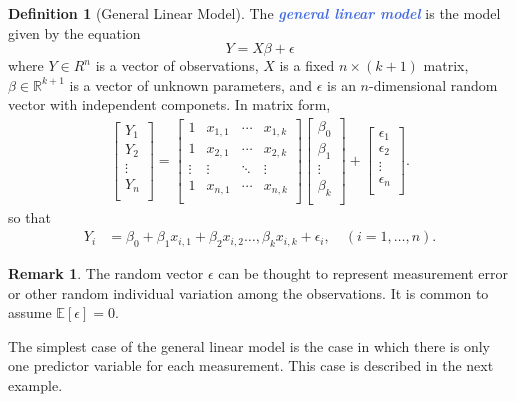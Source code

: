 \documentclass[10pt]{article}
\theoremstyle{definition}
\newtheorem{definition}[theorem]{Definition}
\newtheorem{remark}[theorem]{Remark}
\newcommand{\1}[1]{\textbf{1}_{\left[#1\right]}} %
\def\R{\mathbb{R}} %
\def\E{\mathbb{E}} %
\newcommand{\demph}[1]{\textcolor{RoyalBlue}{\textbf{\slshape #1}}} %
\begin{document}
\begin{definition}[General Linear Model]
  \label{def:general-linear-model}
  The \demph{general linear model} is the model given by the equation
  \begin{equation} \label{eq:general-linear-model-equation}
    Y= X\beta +\epsilon
  \end{equation}
  where $Y\in R^{n}$ is a vector of observations, $X$ is a fixed
  $n\times (k+1)$ matrix, $\beta\in \R^{k+1}$ is a vector of unknown
  parameters, and $\epsilon$ is an $n$-dimensional random vector with
  independent componets. In matrix form,
  \begin{align*}
    \begin{bmatrix}
      Y_{1}\\ Y_{2}\\\vdots \\ Y_{n}\\
    \end{bmatrix}
    =
    \begin{bmatrix}
      1&x_{1,1}&\cdots&x_{1,k}\\
      1&x_{2,1}&\cdots&x_{2,k}\\
      \vdots&\vdots&\ddots&\vdots\\
      1&  x_{n,1}&\cdots&x_{n,k}\\
    \end{bmatrix}
    \begin{bmatrix}
      \beta_{0}\\ \beta_{1}\\ \vdots \\ \beta_{k}\\
    \end{bmatrix}
    +
    \begin{bmatrix}
      \epsilon_{1}\\ \epsilon_{2}\\\vdots \\ \epsilon_{n}\\
    \end{bmatrix}.
  \end{align*}
  so that
  \begin{align*}
    Y_{i}
    &=  \beta_{0}+\beta_{1}x_{i,1}+\beta_{2}x_{i,2}\ldots,\beta_{k}x_{i,k}
      + \epsilon_{i},\quad (i=1,\ldots,n).
  \end{align*}
  \begin{remark}
    The random vector $\epsilon$ can be thought to represent measurement error
    or other random individual variation among the observations. It is common
    to assume $\E\left[\epsilon \right]=0$.
  \end{remark}
\end{definition}
The simplest case of the general linear model is the case in which there is only
one predictor variable for each measurement. This case is described in the next
example.
\end{document}
